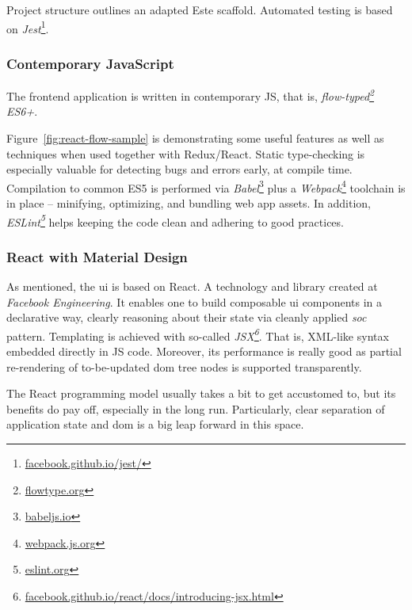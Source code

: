Project structure outlines an adapted Este scaffold. Automated testing is based on \emph{Jest}\footnote{\textcolor{blue}{\href{https://facebook.github.io/jest/}{facebook.github.io/jest/}}}.


\subsubsection{Contemporary JavaScript}

The frontend application is written in contemporary JS, that is, \emph{flow-typed\footnote{\textcolor{blue}{\href{https://flowtype.org/}{flowtype.org}}} ES6+}.

Figure~\ref{fig:react-flow-sample} is demonstrating some useful features as well as techniques when used together with Redux/React. Static type-checking is especially valuable for detecting bugs and errors early, at compile time. Compilation to common ES5 is performed via \emph{Babel}\footnote{\textcolor{blue}{\href{https://babeljs.io/}{babeljs.io}}} plus a \emph{Webpack}\footnote{\textcolor{blue}{\href{https://webpack.js.org/}{webpack.js.org}}} toolchain is in place -- minifying, optimizing, and bundling web app assets.
In addition, \emph{ESLint\footnote{\textcolor{blue}{\href{http://eslint.org/}{eslint.org}}}} helps keeping the code clean and adhering to good practices.

\subsubsection{React with Material Design}

As mentioned, the \gls{ui} is based on React.
A technology and library created at \emph{Facebook Engineering}.
It enables one to build composable \gls{ui} components in a declarative way, clearly reasoning about their state via cleanly applied \emph{\gls{soc}} pattern.
Templating is achieved with so-called \emph{JSX\footnote{\textcolor{blue}{\href{https://facebook.github.io/react/docs/introducing-jsx.html}{facebook.github.io/react/docs/introducing-jsx.html}}}}.
That is, \textsc{XML}-like syntax embedded directly in \textsc{JS} code.
Moreover, its performance is really good as partial re-rendering of to-be-updated \gls{dom} tree nodes is supported transparently.

The React programming model usually takes a bit to get accustomed to, but its benefits do pay off, especially in the long run.
Particularly, clear separation of application state and \gls{dom} is a big leap forward in this space.

